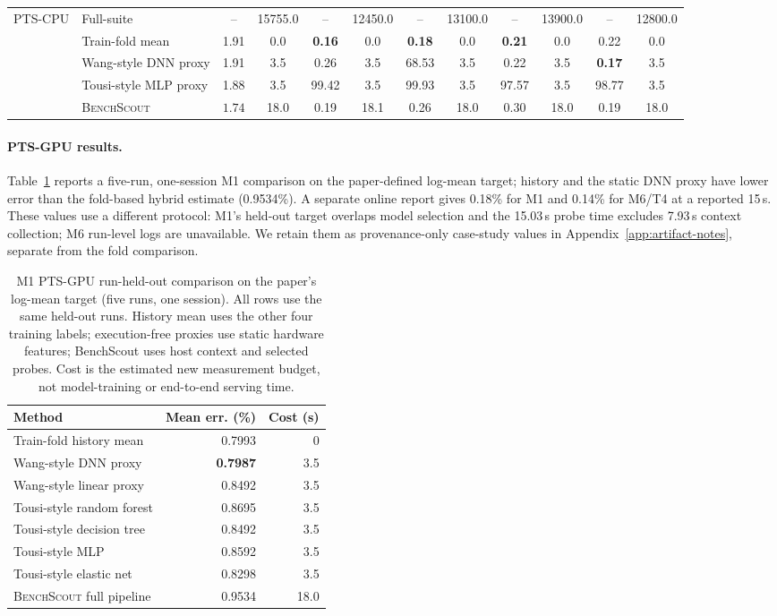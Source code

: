 \documentclass[sigconf, review, anonymous, balance=false]{acmart}
\newcommand{\ourmethod}{\textsc{BenchScout}\xspace}
\newcommand{\ptscpu}{PTS-CPU}
\begin{document}
\begin{table}[t]
\begin{tabular}{llcccccccccc}
\multirow{5}{*}{\ptscpu} 
& Full-suite & -- & 15755.0 & -- & 12450.0 & -- & 13100.0 & -- & 13900.0 & -- & 12800.0 \\
& Train-fold mean & 1.91 & 0.0 & \textbf{0.16} & 0.0 & \textbf{0.18} & 0.0 & \textbf{0.21} & 0.0 & 0.22 & 0.0 \\
& Wang-style DNN proxy & 1.91 & 3.5 & 0.26 & 3.5 & 68.53 & 3.5 & 0.22 & 3.5 & \textbf{0.17} & 3.5 \\
& Tousi-style MLP proxy & 1.88 & 3.5 & 99.42 & 3.5 & 99.93 & 3.5 & 97.57 & 3.5 & 98.77 & 3.5 \\
& \ourmethod & $\mathbf{1.74}$ & 18.0 & 0.19 & 18.1 & 0.26 & 18.0 & 0.30 & 18.0 & 0.19 & 18.0 \\

\bottomrule
\end{tabular}
\end{table}



\paragraph{PTS-GPU results.} Table~\ref{tab:pts-gpu-audited} reports a five-run, one-session M1 comparison on the paper-defined log-mean target; history and the static DNN proxy have lower error than the fold-based hybrid estimate (0.9534\%). A separate online report gives 0.18\% for M1 and 0.14\% for M6/T4 at a reported 15\,s. These values use a different protocol: M1's held-out target overlaps model selection and the 15.03\,s probe time excludes 7.93\,s context collection; M6 run-level logs are unavailable. We retain them as provenance-only case-study values in Appendix~\ref{app:artifact-notes}, separate from the fold comparison.

\begin{table}[t]
\centering
\caption{M1 PTS-GPU run-held-out comparison on the paper's log-mean target (five runs, one session). All rows use the same held-out runs. History mean uses the other four training labels; execution-free proxies use static hardware features; BenchScout uses host context and selected probes. Cost is the estimated new measurement budget, not model-training or end-to-end serving time.}
\label{tab:pts-gpu-audited}
\tiny
\setlength{\tabcolsep}{1.5pt}
\begin{tabular}{lrr}
\toprule
\textbf{Method} & \textbf{Mean err. (\%)} & \textbf{Cost (s)} \\
\midrule
Train-fold history mean & 0.7993 & 0 \\
Wang-style DNN proxy & \textbf{0.7987} & 3.5 \\
Wang-style linear proxy & 0.8492 & 3.5 \\
Tousi-style random forest & 0.8695 & 3.5 \\
Tousi-style decision tree & 0.8492 & 3.5 \\
Tousi-style MLP & 0.8592 & 3.5 \\
Tousi-style elastic net & 0.8298 & 3.5 \\
\ourmethod{} full pipeline & 0.9534 & 18.0 \\
\bottomrule
\end{tabular}
\end{table}
\end{document}
